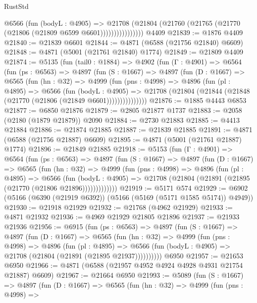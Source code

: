 \begin{lexlean}{RustStd}
\begin{coremodule}
{\begin{coremodule}
{{{{{{{{{{{{{{{{{{{{{{{{{{{{{                    @6566
                      (fun (bodyL : @4905) =>
                      @21708
                        (@21804 (@21760 (@21765 (@21770 (@21806 (@21809 @6599 @6601))))))))))))))))
    @4409
@21839 := @1876 @4409
@21840 := @21839 @6601
@21844 := @4871 (@6588 (@21756 @21840) @6609)
@21848 := @4871 (@5001 (@21761 @21840) @1774)
@21849 := @21809 @4409
@21874 := @5135
    (fun (tail0 : @1884) =>
    @4902
      (fun (Γ : @4901) =>
      @6564
        (fun (ps : @6563) =>
        @4897
          (fun (S : @1667) =>
          @4897
            (fun (D : @1667) =>
            @6565
              (fun (hn : @32) =>
              @4999
                (fun (pns : @4998) =>
                @4896
                  (fun (pl : @4895) =>
                  @6566
                    (fun (bodyL : @4905) =>
                    @21708 (@21804 (@21844 (@21848 (@21770 (@21806 (@21849 @6601)))))))))))))))
@21876 := @1885 @4443 @6853
@21877 := @6850 @21876
@21879 := @2805 @21877 @1737
@21883 := @2058 (@2180 (@1879 @21879)) @2090
@21884 := @2730 @21883
@21885 := @4413 @21884
@21886 := @21874 @21885
@21887 := @21839 @21885
@21891 := @4871 (@6588 (@21756 @21887) @6609)
@21895 := @4871 (@5001 (@21761 @21887) @1774)
@21896 := @21849 @21885
@21918 := @5153
    (fun (Γ : @4901) =>
    @6564
      (fun (ps : @6563) =>
      @4897
        (fun (S : @1667) =>
        @4897
          (fun (D : @1667) =>
          @6565
            (fun (hn : @32) =>
            @4999
              (fun (pns : @4998) =>
              @4896
                (fun (pl : @4895) =>
                @6566
                  (fun (bodyL : @4905) =>
                  @21708 (@21804 (@21891 (@21895 (@21770 (@21806 @21896)))))))))))))
@21919 := @5171 @574
@21929 := @6902 (@5166 (@6390 (@21919 @6392)) (@5166 (@5169 (@5171 @1585 @5174)) @4949))
@21930 := @21918 @21929
@21932 := @21768 (@4962 @21929)
@21933 := @4871 @21932
@21936 := @4969 @21929 @21805 @21896
@21937 := @21933 @21936
@21956 := @6915
    (fun (ps : @6563) =>
    @4897
      (fun (S : @1667) =>
      @4897
        (fun (D : @1667) =>
        @6565
          (fun (hn : @32) =>
          @4999
            (fun (pns : @4998) =>
            @4896
              (fun (pl : @4895) =>
              @6566 (fun (bodyL : @4905) => @21708 (@21804 (@21891 (@21895 @21937))))))))))
    @6950
@21957 := @21653 @6950
@21966 := @4871 (@6588 (@21957 @4952 @4924 @4928 @4931 @21754 @21887) @6609)
@21967 := @21664 @6950
@21993 := @5089
    (fun (S : @1667) =>
    @4897
      (fun (D : @1667) =>
      @6565
        (fun (hn : @32) =>
        @4999
          (fun (pns : @4998) =>
}}}}}}}}}}}}}}}}}}}}}}}}}}}}}
\end{coremodule}}
\end{coremodule}
\end{lexlean}
